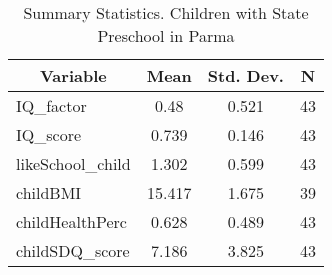 
\begin{table}[htbp]\centering \caption{Summary Statistics. Children with State Preschool in Parma \label{bothChildmaternaStatParma}}
\begin{tabular}{l c c  c}\hline\hline
\multicolumn{1}{c}{\textbf{Variable}} & \textbf{Mean}
 & \textbf{Std. Dev.} & \textbf{N}\\ \hline
IQ\_factor & 0.48 & 0.521  & 43\\
IQ\_score & 0.739 & 0.146  & 43\\
likeSchool\_child & 1.302 & 0.599  & 43\\
childBMI & 15.417 & 1.675  & 39\\
childHealthPerc & 0.628 & 0.489  & 43\\
childSDQ\_score & 7.186 & 3.825  & 43\\
\hline\end{tabular}
\end{table}
